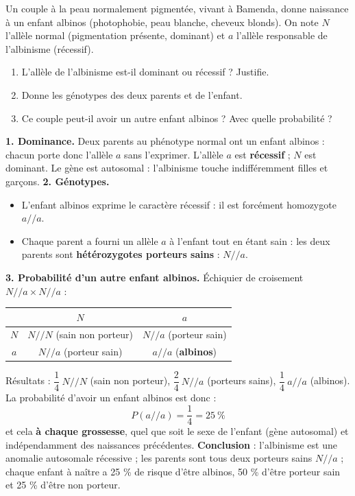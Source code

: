 \documentclass[11pt]{article}
\begin{document}
\begin{exoresolu}
Un couple à la peau normalement pigmentée, vivant à Bamenda, donne naissance à un enfant albinos (photophobie, peau blanche, cheveux blonds). On note $N$ l'allèle normal (pigmentation présente, dominant) et $a$ l'allèle responsable de l'albinisme (récessif).
\begin{enumerate}
\item L'allèle de l'albinisme est-il dominant ou récessif ? Justifie.
\item Donne les génotypes des deux parents et de l'enfant.
\item Ce couple peut-il avoir un autre enfant albinos ? Avec quelle probabilité ?
\end{enumerate}
\tcblower
\textbf{1. Dominance.} Deux parents au phénotype normal ont un enfant albinos : chacun porte donc l'allèle $a$ sans l'exprimer. L'allèle $a$ est \textbf{récessif} ; $N$ est dominant. Le gène est autosomal : l'albinisme touche indifféremment filles et garçons.
\textbf{2. Génotypes.}
\begin{itemize}
\item L'enfant albinos exprime le caractère récessif : il est forcément homozygote $a/\!/a$.
\item Chaque parent a fourni un allèle $a$ à l'enfant tout en étant sain : les deux parents sont \textbf{hétérozygotes porteurs sains} : $N/\!/a$.
\end{itemize}
\textbf{3. Probabilité d'un autre enfant albinos.} Échiquier de croisement $N/\!/a \times N/\!/a$ :
\begin{center}
\begin{tabular}{|c|c|c|}
\hline
\rowcolor{popblueL} & $N$ & $a$ \\
\hline
$N$ & $N/\!/N$ (sain non porteur) & $N/\!/a$ (porteur sain) \\
\hline
$a$ & $N/\!/a$ (porteur sain) & $a/\!/a$ (\textbf{albinos}) \\
\hline
\end{tabular}
\end{center}
Résultats : $\dfrac{1}{4}\ N/\!/N$ (sain non porteur), $\dfrac{2}{4}\ N/\!/a$ (porteurs sains), $\dfrac{1}{4}\ a/\!/a$ (albinos). La probabilité d'avoir un enfant albinos est donc :
\[ P(a/\!/a) = \frac{1}{4} = 25\ \% \]
et cela \textbf{à chaque grossesse}, quel que soit le sexe de l'enfant (gène autosomal) et indépendamment des naissances précédentes.
\textbf{Conclusion} : l'albinisme est une anomalie autosomale récessive ; les parents sont tous deux porteurs sains $N/\!/a$ ; chaque enfant à naître a 25 \% de risque d'être albinos, 50 \% d'être porteur sain et 25 \% d'être non porteur.
\end{exoresolu}
\end{document}
